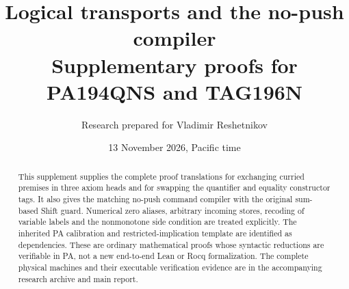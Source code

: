 \documentclass[11pt,letterpaper]{article}
\title{\color{ink}Logical transports and the no-push compiler\\[5pt]
\large Supplementary proofs for PA194QNS and TAG196N}
\author{Research prepared for Vladimir Reshetnikov}
\date{13 November 2026, Pacific time}
\begin{document}
\maketitle
\begin{abstract}
This supplement supplies the complete proof translations for exchanging
curried premises in three axiom heads and for swapping the quantifier and
equality constructor tags. It also gives the matching no-push command
compiler with the original sum-based Shift guard. Numerical zero aliases,
arbitrary incoming stores, recoding of variable labels and the nonmonotone
side condition are treated explicitly. The inherited PA calibration and
restricted-implication template are identified as dependencies. These are
ordinary mathematical proofs whose syntactic reductions are verifiable in
PA, not a new end-to-end Lean or Rocq formalization. The complete physical
machines and their executable verification evidence are in the accompanying
research archive and main report.
\end{abstract}
\tableofcontents
\clearpage


\end{document}
